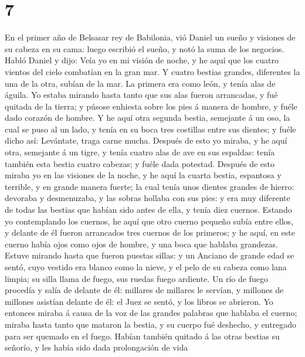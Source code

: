 \hypertarget{section-6}{%
\section{7}\label{section-6}}

 En el primer año de Belsasar rey de Babilonia, vió Daniel
un sueño y visiones de su cabeza en su cama: luego escribió el sueño, y
notó la suma de los negocios.  Habló Daniel y dijo: Veía
yo en mi visión de noche, y he aquí que los cuatro vientos del cielo
combatían en la gran mar.  Y cuatro bestias grandes,
diferentes la una de la otra, subían de la mar.  La
primera era como león, y tenía alas de águila. Yo estaba mirando hasta
tanto que sus alas fueron arrancadas, y fué quitada de la tierra; y
púsose enhiesta sobre los pies á manera de hombre, y fuéle dado corazón
de hombre.  Y he aquí otra segunda bestia, semejante á un
oso, la cual se puso al un lado, y tenía en su boca tres costillas entre
sus dientes; y fuéle dicho así: Levántate, traga carne mucha.
 Después de esto yo miraba, y he aquí otra, semejante á un
tigre, y tenía cuatro alas de ave en sus espaldas: tenía también esta
bestia cuatro cabezas; y fuéle dada potestad.  Después de
esto miraba yo en las visiones de la noche, y he aquí la cuarta bestia,
espantosa y terrible, y en grande manera fuerte; la cual tenía unos
dientes grandes de hierro: devoraba y desmenuzaba, y las sobras hollaba
con sus pies: y era muy diferente de todas las bestias que habían sido
antes de ella, y tenía diez cuernos.  Estando yo
contemplando los cuernos, he aquí que otro cuerno pequeño subía entre
ellos, y delante de él fueron arrancados tres cuernos de los primeros; y
he aquí, en este cuerno había ojos como ojos de hombre, y una boca que
hablaba grandezas.  Estuve mirando hasta que fueron
puestas sillas: y un Anciano de grande edad se sentó, cuyo vestido era
blanco como la nieve, y el pelo de su cabeza como lana limpia; su silla
llama de fuego, sus ruedas fuego ardiente.  Un río de
fuego procedía y salía de delante de él: millares de millares le
servían, y millones de millones asistían delante de él: el Juez se
sentó, y los libros se abrieron.  Yo entonces miraba á
causa de la voz de las grandes palabras que hablaba el cuerno; miraba
hasta tanto que mataron la bestia, y su cuerpo fué deshecho, y entregado
para ser quemado en el fuego.  Habían también quitado á
las otras bestias su señorío, y les había sido dada prolongación de vida
